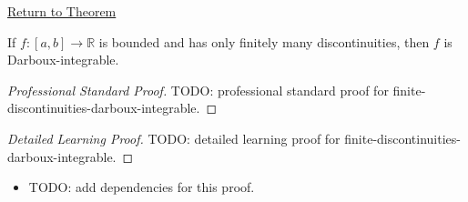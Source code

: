 \newpage
{}
\label{prf:finite-discontinuities-darboux-integrable}
\begin{remark*}[Return]\hyperref[thm:finite-discontinuities-darboux-integrable]{Return to Theorem}\end{remark*}

\begin{theorem*}
If \(f:[a,b]\to\mathbb R\) is bounded and has only finitely many
discontinuities, then \(f\) is Darboux-integrable.
\end{theorem*}

\begin{proof}[Professional Standard Proof]
\LRAProofBodyStart
TODO: professional standard proof for finite-discontinuities-darboux-integrable.
\end{proof}

\begin{proof}[Detailed Learning Proof]
\LRAProofBodyStart
TODO: detailed learning proof for finite-discontinuities-darboux-integrable.
\end{proof}

\begin{remark*}
\end{remark*}

\begin{dependencies}
\begin{itemize}
  \item TODO: add dependencies for this proof.
\end{itemize}
\end{dependencies}

\clearpage
